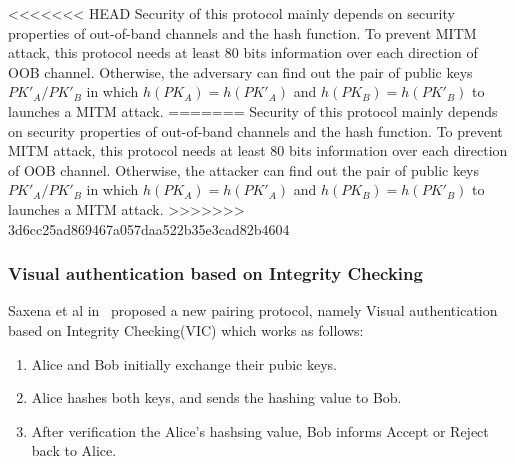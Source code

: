 <<<<<<< HEAD
Security of this protocol mainly depends on security properties of out-of-band channels and the hash function. To prevent MITM attack, this protocol needs at least 80 bits information over each direction of OOB channel. Otherwise, the adversary can find out the pair of public keys $PK'_A/PK'_B$ in which $h(PK_A) = h(PK'_A)$ and $h(PK_B) = h(PK'_B)$ to launches a MITM attack.
=======
Security of this protocol mainly depends on security properties of out-of-band channels and the hash function. To prevent MITM attack, this protocol needs at least 80 bits information over each direction of OOB channel. Otherwise, the attacker can find out the pair of public keys $PK'_A/PK'_B$ in which $h(PK_A) = h(PK'_A)$ and $h(PK_B) = h(PK'_B)$ to launches a MITM attack.
>>>>>>> 3d6cc25ad869467a057daa522b35e3cad82b4604

\subsubsection{Visual authentication based on Integrity Checking}

Saxena et al in~\cite{1624021} proposed a new pairing protocol, namely Visual authentication based on Integrity Checking(VIC) which works as follows:

\begin{enumerate}
\item Alice and Bob initially exchange their pubic keys.
\item Alice hashes both keys, and sends the hashing value to Bob. 
\item After verification the Alice's hashsing value, Bob informs Accept or Reject back to Alice. 
\end{enumerate}

\begin{center}
\end{center}

